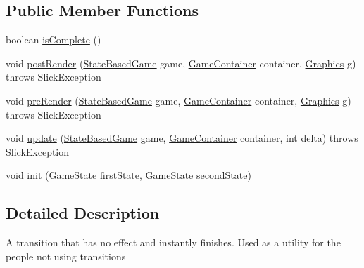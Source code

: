 \subsection*{Public Member Functions}
\begin{DoxyCompactItemize}
\item 
boolean \mbox{\hyperlink{classorg_1_1newdawn_1_1slick_1_1state_1_1transition_1_1_empty_transition_a1edda3494b76acdb7231ac8a039eddce}{is\+Complete}} ()
\item 
void \mbox{\hyperlink{classorg_1_1newdawn_1_1slick_1_1state_1_1transition_1_1_empty_transition_afa7596430720cec5a4899e1018dcef1f}{post\+Render}} (\mbox{\hyperlink{classorg_1_1newdawn_1_1slick_1_1state_1_1_state_based_game}{State\+Based\+Game}} game, \mbox{\hyperlink{classorg_1_1newdawn_1_1slick_1_1_game_container}{Game\+Container}} container, \mbox{\hyperlink{classorg_1_1newdawn_1_1slick_1_1_graphics}{Graphics}} g)  throws Slick\+Exception 
\item 
void \mbox{\hyperlink{classorg_1_1newdawn_1_1slick_1_1state_1_1transition_1_1_empty_transition_a67332f753655254f66e9beced05f59c6}{pre\+Render}} (\mbox{\hyperlink{classorg_1_1newdawn_1_1slick_1_1state_1_1_state_based_game}{State\+Based\+Game}} game, \mbox{\hyperlink{classorg_1_1newdawn_1_1slick_1_1_game_container}{Game\+Container}} container, \mbox{\hyperlink{classorg_1_1newdawn_1_1slick_1_1_graphics}{Graphics}} g)  throws Slick\+Exception 
\item 
void \mbox{\hyperlink{classorg_1_1newdawn_1_1slick_1_1state_1_1transition_1_1_empty_transition_a354222c590151b34c62fbc02d56f30e8}{update}} (\mbox{\hyperlink{classorg_1_1newdawn_1_1slick_1_1state_1_1_state_based_game}{State\+Based\+Game}} game, \mbox{\hyperlink{classorg_1_1newdawn_1_1slick_1_1_game_container}{Game\+Container}} container, int delta)  throws Slick\+Exception 
\item 
void \mbox{\hyperlink{classorg_1_1newdawn_1_1slick_1_1state_1_1transition_1_1_empty_transition_a3f0213c8f0057187a3438bcecb2d3eb8}{init}} (\mbox{\hyperlink{interfaceorg_1_1newdawn_1_1slick_1_1state_1_1_game_state}{Game\+State}} first\+State, \mbox{\hyperlink{interfaceorg_1_1newdawn_1_1slick_1_1state_1_1_game_state}{Game\+State}} second\+State)
\end{DoxyCompactItemize}


\subsection{Detailed Description}
A transition that has no effect and instantly finishes. Used as a utility for the people not using transitions

